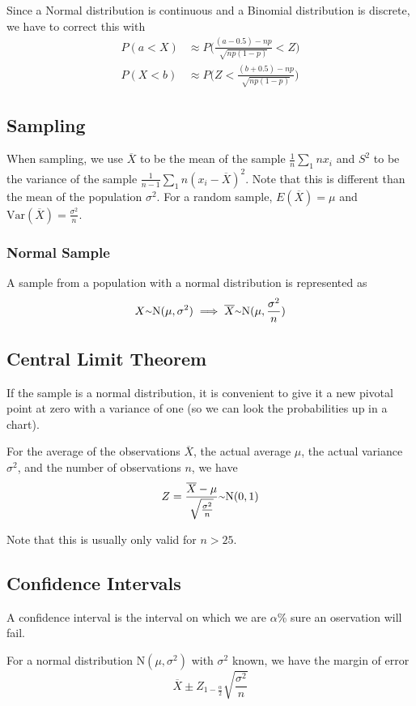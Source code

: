 \documentclass[12pt]{article}
\begin{document}
Since a Normal distribution is continuous and a Binomial distribution is discrete, we have to correct this with
\begin{align*}
P(a < X) &\approx P \bigg( \frac{(a-0.5) - np}{\sqrt{np(1-p)}} < Z \bigg)\\
P(X < b) &\approx P \bigg( Z < \frac{(b+0.5) - np}{\sqrt{np(1-p)}} \bigg)
\end{align*}

\subsection*{Sampling}
When sampling, we use $\overline{X}$ to be the mean of the sample $\frac{1}{n} \sum_{1}{n} x_i$ and $S^2$ to be the variance of the sample $\frac{1}{n-1} \sum_{1}{n} (x_i - \overline{X})^2$. Note that this is different than the mean of the population $\sigma^2$. For a random sample, $E(\overline{X}) = \mu$ and $\text{Var}(\overline{X}) = \frac{\sigma^2}{n}$.

\subsubsection*{Normal Sample}
A sample from a population with a normal distribution is represented as \[ X \ttilde \text{N}(\mu, \sigma^2) \implies \overline{X} \ttilde \text{N}(\mu, \frac{\sigma^2}{n}) \]

\subsection*{Central Limit Theorem}
If the sample is a normal distribution, it is convenient to give it a new pivotal point at zero with a variance of one (so we can look the probabilities up in a chart).

For the average of the observations $\overline{X}$, the actual average $\mu$, the actual variance $\sigma^2$, and the number of observations $n$, we have \[ Z = \frac{\overline{X} - \mu}{\sqrt{\frac{\sigma^2}{n}}} \ttilde \text{N}(0,1) \]

Note that this is usually only valid for $n > 25$.

\subsection*{Confidence Intervals}
A confidence interval is the interval on which we are $\alpha$\% sure an oservation will fail.

For a normal distribution N$(\mu, \sigma^2)$ with $\sigma^2$ known, we have the margin of error \[ \overline{X} \pm Z_{1-\frac{\alpha}{2}} \sqrt{\frac{\sigma^2}{n}} \]
\end{document}
